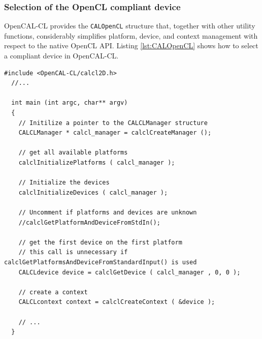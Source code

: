 \subsubsection{Selection of the OpenCL compliant device}

OpenCAL-CL provides the \verb'CALOpenCL' structure that, together with
other utility functions, considerably simplifies platform, device, and
context management with respect to the native OpenCL API. Listing
\ref{lst:CALOpenCL} shows how to select a compliant device in
OpenCAL-CL.

\begin{lstlisting}[float,floatplacement=H, label=lst:CALOpenCL, caption=Access to platform and devices.]
  #include <OpenCAL-CL/calcl2D.h>
  //...

  int main (int argc, char** argv)
  {
    // Initilize a pointer to the CALCLManager structure
    CALCLManager * calcl_manager = calclCreateManager ();

    // get all available platforms
    calclInitializePlatforms ( calcl_manager );

    // Initialize the devices
    calclInitializeDevices ( calcl_manager );

    // Uncomment if platforms and devices are unknown
    //calclGetPlatformAndDeviceFromStdIn();

    // get the first device on the first platform
    // this call is unnecessary if calclGetPlatformsAndDeviceFromStandardInput() is used
    CALCLdevice device = calclGetDevice ( calcl_manager , 0, 0 );

    // create a context
    CALCLcontext context = calclCreateContext ( &device );

    // ...
  }
\end{lstlisting}

